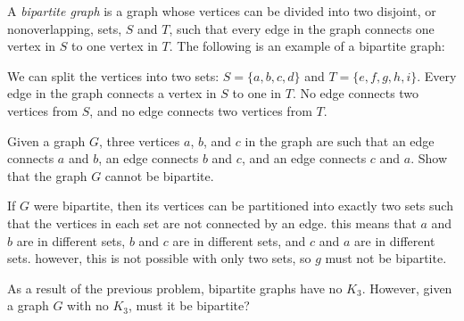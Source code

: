 \documentclass[11pt]{article}
\begin{document}
\begin{definition}
\label{def:bipartite}
A \textit{bipartite graph} is a graph whose vertices can be divided into two disjoint, or nonoverlapping, sets, $S$ and $T$, such that every
edge in the graph connects one vertex in $S$ to one vertex in $T$. The following is an example of a bipartite graph:
\begin{center}
\end{center}
We can split the vertices into two sets: $S=\{a,b,c,d\}$ and $T=\{e,f,g,h,i\}$. Every edge in the graph connects a vertex in $S$ to
one in $T$. No edge connects two vertices from $S$, and no edge connects two vertices from $T$.
\end{definition}

\begin{problem} %
Given a graph $G$, three vertices $a$, $b$, and $c$ in the graph are such that an edge connects $a$ and $b$, an edge connects $b$ and $c$, and an edge
connects $c$ and $a$. Show that the graph $G$ cannot be bipartite.
\end{problem}

\begin{solution}
If $G$ were bipartite, then its vertices can be partitioned into exactly two sets such that the vertices in each set are not connected by an edge.
this means that $a$ and $b$ are in different sets, $b$ and $c$ are in different sets, and $c$ and $a$ are in different sets. however, this is not possible
with only two sets, so $g$ must not be bipartite.
\end{solution}

\begin{problem} %
As a result of the previous problem, bipartite graphs have no $K_3$. However, given a graph $G$ with no $K_3$, must it be bipartite?
\end{problem}
\end{document}
